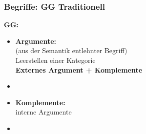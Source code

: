 \begin{frame}
\frametitle{Begriffe: GG \vs Traditionell}

	\begin{minipage}[b]{0.47\textwidth}
		\footnotesize
	\textbf{GG:}
		\begin{itemize}
		\item \textbf{Argumente:}\\
		(aus der Semantik entlehnter Begriff)\\
		Leerstellen einer Kategorie \\
		\ras \textbf{Externes Argument + Komplemente}
		\item[]	
		\item \alert{\textbf{Komplemente:}}\\
		\ras interne Argumente
		\item[]
		\end{itemize}	
  	\end{minipage}  
	\begin{minipage}[b]{0.48\textwidth}
		\begin{figure}
	\centering
	\end{figure}
  	\end{minipage}

\end{frame}


